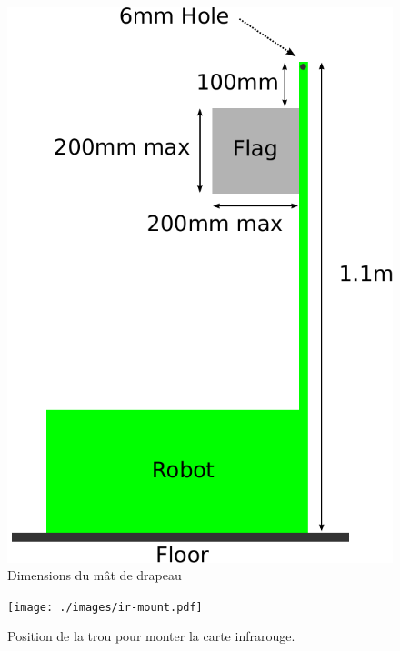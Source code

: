 \begin{figure}
 \begin{center}
  \includegraphics[keepaspectratio, scale =0.7]{./images/flag-2011.pdf}
  \caption{\label{fig:flag}Dimensions du mât de drapeau}
 \end{center}
\end{figure}

\begin{figure}
 \begin{center}
  \texttt{[image: ./images/ir-mount.pdf]}
  \caption{\label{fig:ir-mount}Position de la trou pour monter la carte infrarouge.}
 \end{center}
\end{figure}

\clearpage
